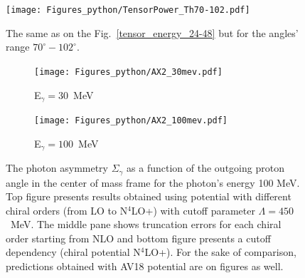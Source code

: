    \begin{figure}[h]
        \begin{center}
        \texttt{[image: Figures\_python/TensorPower\_Th70-102.pdf]}
        \end{center}
        \caption{The same as on the Fig.~\ref*{tensor_energy_24-48} but
        for the angles' range $70^{\circ} - 102^{\circ}$.}
        \label{tensor_energy_70-102}
    \end{figure}
    
    
    \begin{figure}[h]
        \centering
        \begin{subfigure}[b]{0.46\textwidth}
            \texttt{[image: Figures\_python/AX2\_30mev.pdf]}
            \caption{\small E$_\gamma = 30$~MeV}
            \label{AX_30_vert}
        \end{subfigure}
        \begin{subfigure}[b]{0.46\textwidth}
            \texttt{[image: Figures\_python/AX2\_100mev.pdf]}
            \caption{\small E$_\gamma = 100$~MeV}
            \label{AX_100_vert}
        \end{subfigure}
        \caption{The photon asymmetry $\Sigma_\gamma$ 
        as a function of the outgoing proton angle in the center of mass frame 
        for the photon's energy 100 MeV.
        Top figure presents results obtained using potential
        with different chiral orders (from LO to N$^4$LO+) with cutoff parameter $\Lambda=450$~MeV.
        The middle pane shows truncation errors for each 
        chiral order starting from NLO and
        bottom figure presents a cutoff dependency (chiral potential N$^4$LO+).
        For the sake of comparison, predictions obtained with AV18 potential are on  figures as well.}
    \end{figure}
     
